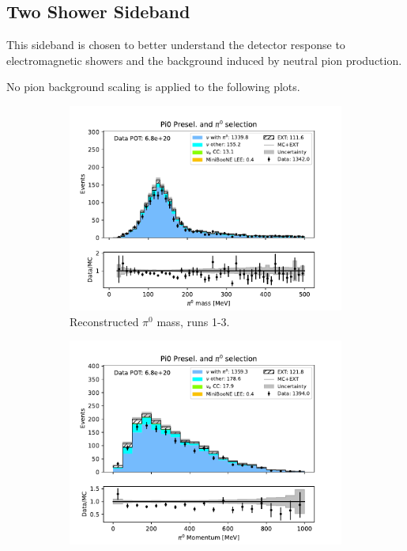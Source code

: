 \subsection{Two Shower Sideband}
\label{sec:TwoShowerSideband}

This sideband is chosen to better understand the detector response to electromagnetic showers and the background induced by neutral pion production.


No pion background scaling is applied to the following plots.

\begin{figure}[H]
    \centering
    \begin{subfigure}{0.33\linewidth}
        \includegraphics[width=\linewidth]{technote/Sidebands/Figures/TwoShowerSideband/two_shr_sideband_pi0_mass_Y_corr_run123_PI0_PI0.pdf}
        \caption{Reconstructed $\pi^0$ mass, runs 1-3.}
    \end{subfigure}%
    \begin{subfigure}{0.33\linewidth}
        \includegraphics[width=\linewidth]{technote/Sidebands/Figures/TwoShowerSideband/two_shr_sideband_pi0momentum_run123_PI0_PI0.pdf}

\end{subfigure}
\end{figure}
